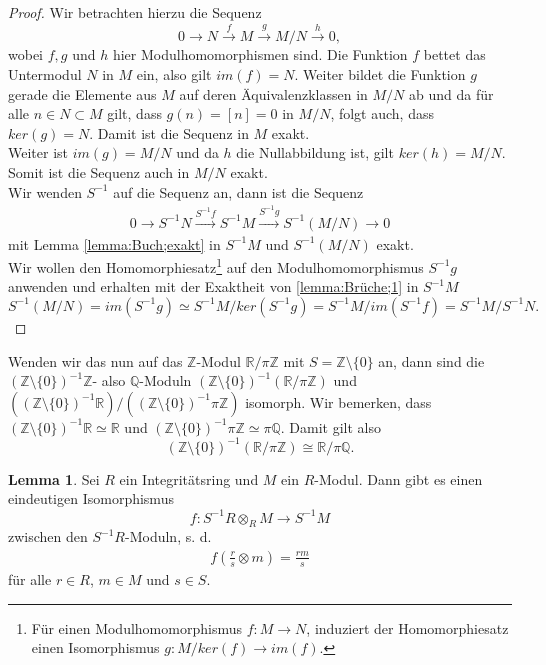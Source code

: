 \documentclass[11pt,titlepage]{article}
\newcommand{\setZ}{\mathbb{Z}}
\newcommand{\setQ}{\mathbb{Q}}
\newcommand{\setR}{\mathbb{R}}
\theoremstyle{definition}
\newtheorem{lemma}[theorem]{Lemma}
\theoremstyle{remark}
\begin{document}
	\begin{proof}
		Wir betrachten hierzu die Sequenz
		\[0\to N\xrightarrow{f} M\xrightarrow{g} M/N\xrightarrow{h} 0,\]
		wobei $f,g$ und $h$ hier Modulhomomorphismen sind. Die Funktion 
		$f$ bettet das Untermodul $N$ in $M$ ein, also gilt 
		$im(f)=N$. Weiter bildet die Funktion $g$ gerade die Elemente aus $M$ 
		auf deren Äquivalenzklassen in $M/N$ ab und da für alle $n\in N\subset M$ 
		gilt, dass $g(n)=[n]=0$ in $M/N$, folgt auch, dass $ker(g)=N$. Damit 
		ist die Sequenz in $M$ exakt. \\
		Weiter ist $im(g)=M/N$ und da $h$ die Nullabbildung ist, gilt $ker(h)=M/N$. 
		Somit ist die Sequenz auch in $M/N$ exakt. \\
		Wir wenden $S^{-1}$ auf die Sequenz an, dann ist die Sequenz
		\begin{align}
			0\to S^{-1}N \xrightarrow{S^{-1}f} S^{-1}M \xrightarrow{S^{-1}g}
			S^{-1}(M/N)\to 0 \label{lemma:Brüche;1}
		\end{align}
		mit Lemma \ref{lemma:Buch;exakt} in $S^{-1}M$ und $S^{-1}(M/N)$ exakt. \\
		Wir wollen den Homomorphiesatz\footnote{Für einen Modulhomomorphismus 
		$f:M\to N$, induziert der Homomorphiesatz einen Isomorphismus 
		$g:M/ker(f)\to im(f)$.} auf den Modulhomomorphismus 
		$S^{-1}g$ anwenden und erhalten mit der Exaktheit von \ref{lemma:Brüche;1} 
		in $S^{-1}M$
		\[ S^{-1}(M/N)=im(S^{-1}g)\simeq S^{-1}M/ker(S^{-1}g) =S^{-1}M/im(S^{-1}f)=S^{-1}M/S^{-1}N.\]
	\end{proof}
	
	Wenden wir das nun auf das $\setZ$-Modul $\setR /\pi\setZ$ mit 
	$S=\setZ\setminus\{0\}$ an, dann sind die $(\setZ\setminus\{0\})^{-1}\setZ$- also $\setQ$-Moduln 
	$(\setZ\setminus\{0\})^{-1}(\setR /\pi\setZ)$ und 
	$\left((\setZ\setminus\{0\})^{-1}\setR\right) /\left((\setZ\setminus\{0\})^{-1}\pi\setZ\right)$ 
	isomorph. Wir bemerken, dass $(\setZ\setminus\{0\})^{-1}\setR\simeq\setR$ und 
	$(\setZ\setminus\{0\})^{-1}\pi\setZ\simeq\pi\setQ$. Damit gilt also 
	\[ (\setZ\setminus\{0\})^{-1}(\setR /\pi\setZ)\cong \setR/\pi\setQ.\]
	
	\begin{lemma} \label{lemma:lociso}
		Sei $R$ ein Integritätsring und $M$ ein $R$-Modul. Dann gibt es einen 
		eindeutigen Isomorphismus
		\[f:S^{-1}R\otimes_R M\to S^{-1}M\]
		zwischen den $S^{-1}R$-Moduln, s. d.
		\begin{align}
			f\left(\frac{r}{s}\otimes m\right)=\frac{rm}{s} \label{lemma:lociso;1}
		\end{align}
		für alle $r\in R$, $m\in M$ und $s\in S$.
	\end{lemma}
	
\end{document}
